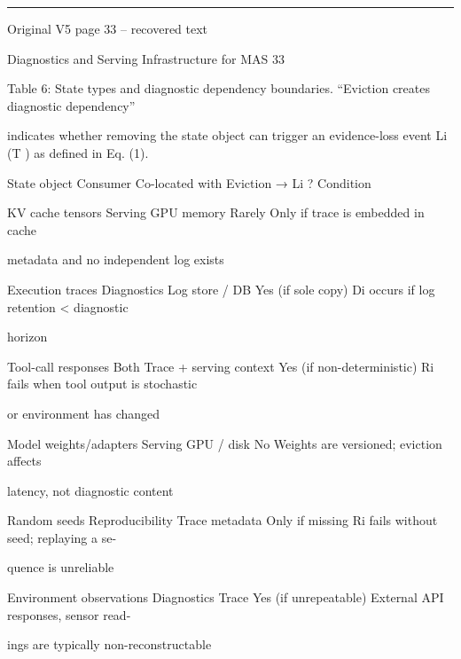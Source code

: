 \par\smallskip\noindent\rule{\textwidth}{0.4pt}\par{\sffamily\footnotesize Original V5 page 33 -- recovered text}\par\begin{flushleft}\footnotesize\ttfamily
\par\smallskip
\par\smallskip
\noindent Diagnostics and Serving Infrastructure for MAS 33\par
\par\smallskip
\par\smallskip
\noindent Table 6: State types and diagnostic dependency boundaries. “Eviction creates diagnostic dependency”\par
\noindent indicates whether removing the state object can trigger an evidence-loss event Li (T ) as defined in Eq. (1).\par
\par\smallskip
\noindent State object Consumer Co-located with Eviction → Li ? Condition\par
\noindent KV cache tensors Serving GPU memory Rarely Only if trace is embedded in cache\par
\noindent  metadata and no independent log exists\par
\noindent Execution traces Diagnostics Log store / DB Yes (if sole copy) Di occurs if log retention < diagnostic\par
\noindent  horizon\par
\noindent Tool-call responses Both Trace + serving context Yes (if non-deterministic) Ri fails when tool output is stochastic\par
\noindent  or environment has changed\par
\noindent Model weights/adapters Serving GPU / disk No Weights are versioned; eviction affects\par
\noindent  latency, not diagnostic content\par
\noindent Random seeds Reproducibility Trace metadata Only if missing Ri fails without seed; replaying a se-\par
\noindent  quence is unreliable\par
\noindent Environment observations Diagnostics Trace Yes (if unrepeatable) External API responses, sensor read-\par
\noindent  ings are typically non-reconstructable\par
\par\smallskip

\end{flushleft}
